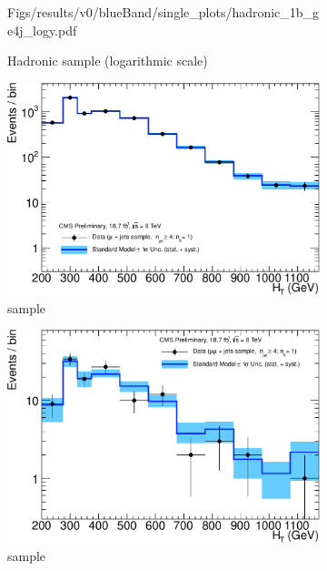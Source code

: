 \begin{figure}[h!]
\begin{subfigure}[b]{0.48\textwidth}
    {Figs/results/v0/blueBand/single_plots/hadronic_1b_ge4j_logy.pdf}
    \caption{Hadronic sample (logarithmic scale)}
  \end{subfigure}
  \begin{subfigure}[b]{0.48\textwidth}
    \includegraphics[width=\textwidth]
    {Figs/results/v0/blueBand/single_plots/muon_1b_ge4j_logy.pdf}
    \caption{\mj sample}
  \end{subfigure}
  \begin{subfigure}[b]{0.48\textwidth}
    \includegraphics[width=\textwidth]
    {Figs/results/v0/blueBand/single_plots/mumu_1b_ge4j_logy.pdf}
    \caption{\mmj sample}
  \end{subfigure}\\
  \vspace{0.7cm}\begin{subfigure}[b]{0.48\textwidth}

\end{subfigure}
\end{figure}
